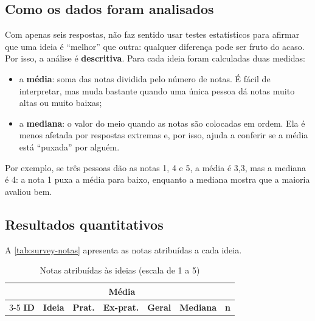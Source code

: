 \subsection{Como os dados foram analisados}

Com apenas seis respostas, não faz sentido usar testes estatísticos para
afirmar que uma ideia é ``melhor'' que outra: qualquer diferença pode ser
fruto do acaso. Por isso, a análise é \textbf{descritiva}. Para cada
ideia foram calculadas duas medidas:

\begin{itemize}
  \item a \textbf{média}: soma das notas dividida pelo número de notas. É
        fácil de interpretar, mas muda bastante quando uma única pessoa
        dá notas muito altas ou muito baixas;
  \item a \textbf{mediana}: o valor do meio quando as notas são
        colocadas em ordem. Ela é menos afetada por respostas extremas e,
        por isso, ajuda a conferir se a média está ``puxada'' por alguém.
\end{itemize}

Por exemplo, se três pessoas dão as notas 1, 4 e 5, a média é 3,3, mas a
mediana é 4: a nota 1 puxa a média para baixo, enquanto a mediana mostra
que a maioria avaliou bem.

\subsection{Resultados quantitativos}

A \autoref{tab:survey-notas} apresenta as notas atribuídas a cada ideia.

\begin{table}[!htb]
  \centering
  \caption{Notas atribuídas às ideias (escala de 1 a 5)}
  \label{tab:survey-notas}
  \footnotesize
  \begin{tabular}{clccccc}
    \toprule
    & & \multicolumn{3}{c}{\textbf{Média}} & & \\
    \cmidrule(lr){3-5}
    \textbf{ID} & \textbf{Ideia} & \textbf{Prat.} & \textbf{Ex-prat.} & \textbf{Geral} & \textbf{Mediana} & \textbf{n} \\
    \midrule
  \end{tabular}
\end{table}

